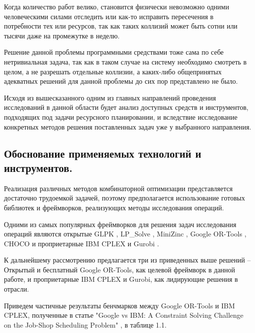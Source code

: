 Когда количество работ велико, становится физически невозможно одними человеческими силами отследить или как-то исправить пересечения в потребности тех или ресурсов, так как таких коллизий может быть сотни или тысячи даже на промежутке в неделю.

Решение данной проблемы программными средствами тоже сама по себе нетривиальная задача, так как в таком случае на систему необходимо смотреть в целом, а не разрешать отдельные коллизии, а каких-либо общепринятых адекватных решений для данной проблемы до сих пор представлено не было.

Исходя из вышесказанного одним из главных направлений проведения исследований в данной области будет анализ доступных средств и инструментов, подходящих под задачи ресурсного планировании, и вследствие исследование конкретных методов решения поставленных задач уже у выбранного направления.

\subsection{Обоснование применяемых технологий и инструментов.}
Реализация различных методов комбинаторной оптимизации представляется достаточно трудоемкой задачей, поэтому предполагается использование готовых библиотек и фреймворков, реализующих методы исследования операций.

Одними из самых популярных фреймворков для решения задач исследования операций являются открытые GLPK \cite{glpk}, LP\_Solve \cite{lpsolve}, MiniZinc \cite{minizinc}, Google OR-Tools \cite{ortools}, CHOCO \cite{choco} и проприетарные IBM CPLEX \cite{cplex} и Gurobi \cite{gurobi}.

К дальнейшему рассмотрению предлагается три из приведенных выше решений -- Открытый и бесплатный Google OR-Tools, как целевой фреймворк в данной работе, и проприетарные IBM CPLEX и Gurobi, как лидирующие решения в отрасли.

Приведем частичные результаты бенчмарков между Google OR-Tools и IBM CPLEX, полученные в статье "Google vs IBM: A Constraint Solving Challenge on the Job-Shop Scheduling Problem" \cite{orvsplex}, в таблице 1.1.

